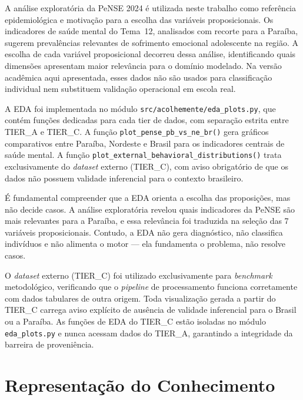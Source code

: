 \documentclass[
    12pt,
    openright,
    oneside,
    a4paper,
    english,
    brazil
]{abntex2}
\begin{document}
A an\'alise explorat\'oria da PeNSE 2024 \'e utilizada neste trabalho como refer\^encia epidemiol\'ogica e motiva\c{c}\~ao para a escolha das vari\'aveis proposicionais. Os indicadores de sa\'ude mental do Tema~12, analisados com recorte para a Para\'iba, sugerem preval\^encias relevantes de sofrimento emocional adolescente na regi\~ao. A escolha de cada vari\'avel proposicional decorreu dessa an\'alise, identificando quais dimens\~oes apresentam maior relev\^ancia para o dom\'inio modelado. Na vers\~ao acad\^emica aqui apresentada, esses dados n\~ao s\~ao usados para classifica\c{c}\~ao individual nem substituem valida\c{c}\~ao operacional em escola real.

A EDA foi implementada no m\'odulo \texttt{src/acolhemente/eda\_plots.py}, que cont\'em fun\c{c}\~oes dedicadas para cada tier de dados, com separa\c{c}\~ao estrita entre TIER\_A e TIER\_C. A fun\c{c}\~ao \texttt{plot\_pense\_pb\_vs\_ne\_br()} gera gr\'aficos comparativos entre Para\'iba, Nordeste e Brasil para os indicadores centrais de sa\'ude mental. A fun\c{c}\~ao \texttt{plot\_external\_behavioral\_distributions()} trata exclusivamente do \textit{dataset} externo (TIER\_C), com aviso obrigat\'orio de que os dados n\~ao possuem validade inferencial para o contexto brasileiro.

\'E fundamental compreender que a EDA orienta a escolha das proposi\c{c}\~oes, mas n\~ao decide casos. A an\'alise explorat\'oria revelou quais indicadores da PeNSE s\~ao mais relevantes para a Para\'iba, e essa relev\^ancia foi traduzida na sele\c{c}\~ao das 7 vari\'aveis proposicionais. Contudo, a EDA n\~ao gera diagn\'ostico, n\~ao classifica indiv\'iduos e n\~ao alimenta o motor --- ela fundamenta o problema, n\~ao resolve casos.

O \textit{dataset} externo (TIER\_C) foi utilizado exclusivamente para \textit{benchmark} metodol\'ogico, verificando que o \textit{pipeline} de processamento funciona corretamente com dados tabulares de outra origem. Toda visualiza\c{c}\~ao gerada a partir do TIER\_C carrega aviso expl\'icito de aus\^encia de validade inferencial para o Brasil ou a Para\'iba. As fun\c{c}\~oes de EDA do TIER\_C est\~ao isoladas no m\'odulo \texttt{eda\_plots.py} e nunca acessam dados do TIER\_A, garantindo a integridade da barreira de proveni\^encia.

\chapter{Representa\c{c}\~ao do Conhecimento}
\end{document}
